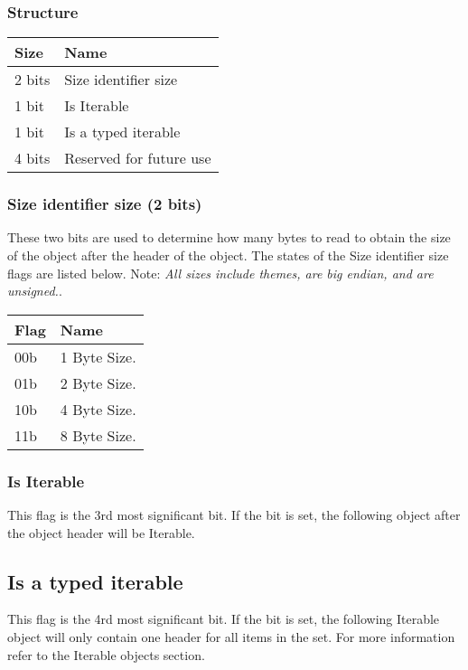 \documentclass[11pt]{article}
\begin{document}
\subsubsection{Structure}
\begin{center}
\begin{tabular}{ |l|l| } 
\hline
\textbf{Size} & \textbf{Name}\\
\hline
2 bits & Size identifier size \\  
1 bit &  Is Iterable \\  
1 bit & Is a typed iterable \\  
4 bits & Reserved for future use \\
\hline
\end{tabular}
\end{center}

\subsubsection{Size identifier size (2 bits)}
These two bits are used to determine how many bytes to read to obtain the size of the object after the header of the object. The states of the Size identifier size flags are listed below. Note: \textit{All sizes include themes, are big endian, and are unsigned.}.
 
\begin{center}
\begin{tabular}{ |l|l| } 
\hline
\textbf{Flag} & \textbf{Name}\\
\hline
00b & 1 Byte Size. \\  
01b & 2 Byte Size. \\  
10b & 4 Byte Size.  \\  
11b & 8 Byte Size. \\
\hline
\end{tabular}
\end{center}

\subsubsection{Is Iterable}
This flag is the 3rd most significant bit. If the bit is set, the following object after the object header will be Iterable.

\subsection{Is a typed iterable}
This flag is the 4rd most significant bit. If the bit is set, the following Iterable object will only contain one header for all items in the set. For more information refer to the Iterable objects section.
\end{document}
